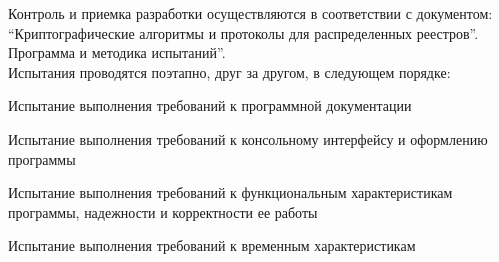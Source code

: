 Контроль и приемка разработки осуществляются в соответствии с документом: 
``Криптографические алгоритмы и протоколы для распределенных реестров''. 
Программа и методика испытаний''. \\
Испытания проводятся поэтапно, друг за другом, в следующем порядке:
\begin{my_enumerate}
	\item Испытание выполнения требований к программной документации
	\item Испытание выполнения требований к консольному интерфейсу и оформлению программы
	\item Испытание выполнения требований к функциональным характеристикам программы, надежности и корректности ее работы
	\item Испытание выполнения требований к временным характеристикам
\end{my_enumerate}
